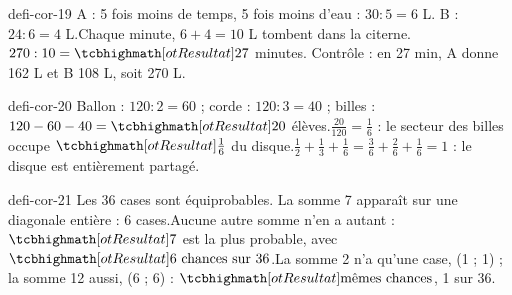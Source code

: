 \begin{blocEdition}{defi-cor-19}
A : 5 fois moins de temps, 5 fois moins d’eau : $30:5=6$ L. B : $24:6=4$ L.Chaque minute, $6+4=10$ L tombent dans la citerne.$270:10=\res{27}$ minutes. Contrôle : en 27 min, A donne 162 L et B 108 L, soit 270 L.
\end{blocEdition}
\begin{blocEdition}{defi-cor-20}
Ballon : $120:2=60$ ; corde : $120:3=40$ ; billes : $120-60-40=\res{20}$ élèves.$\frac{20}{120}=\frac16$ : le secteur des billes occupe $\res{\frac16}$ du disque.$\frac12+\frac13+\frac16=\frac36+\frac26+\frac16=1$ : le disque est entièrement partagé.
\end{blocEdition}
\begin{blocEdition}{defi-cor-21}
Les 36 cases sont équiprobables. La somme 7 apparaît sur une diagonale entière : 6 cases.Aucune autre somme n’en a autant : $\res7$ est la plus probable, avec $\res{6\ \text{chances sur }36}$.La somme 2 n’a qu’une case, (1 ; 1) ; la somme 12 aussi, (6 ; 6) : $\res{\text{mêmes chances}}$, 1 sur 36.
\end{blocEdition}
